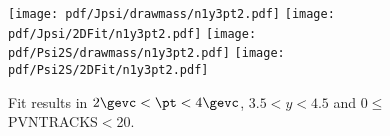 \begin{figure}[H]
\begin{center}
\texttt{[image: pdf/Jpsi/drawmass/n1y3pt2.pdf]}
\texttt{[image: pdf/Jpsi/2DFit/n1y3pt2.pdf]}
\vspace*{-0.5cm}
\texttt{[image: pdf/Psi2S/drawmass/n1y3pt2.pdf]}
\texttt{[image: pdf/Psi2S/2DFit/n1y3pt2.pdf]}
\vspace*{-0.5cm}
\end{center}
\caption{Fit results in $2\gevc<\pt<4\gevc$, $3.5<y<4.5$ and 0$\leq$PVNTRACKS$<$20.}
\label{Fitn1y3pt2}
\end{figure}
